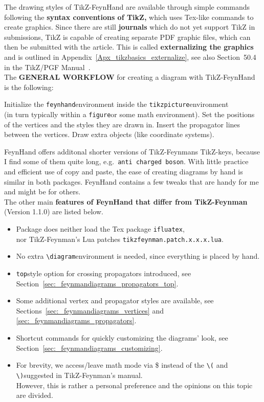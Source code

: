 \documentclass[10pt,letterpaper,twoside,notitlepage]{article}
\numberwithin{figure}{section}
\begin{document}
The drawing styles of TikZ-FeynHand are available through simple commands 
following the \textbf{syntax conventions of TikZ,} 
which uses Tex-like commands to create graphics.
Since there are still \textbf{journals} which do not yet support TikZ in submissions,
TikZ is capable of creating separate PDF graphic files,
which can then be submitted with the article.
This is called \textbf{externalizing the graphics} and is outlined in
Appendix~\ref{Apx_tikzbasics_externalize},
see also Section~50.4 in the TikZ/PGF Manual~\cite{tikz}.
\\[1.5mm]
%
\noindent
The \textbf{GENERAL WORKFLOW} for creating a diagram with TikZ-FeynHand is the following: 
\begin{itemize}
\itembf[0.]
	Initialize the \vercol\verb$feynhand$\txcol environment 
	inside the \vercol\verb$tikzpicture$\txcol environment\\
	(in turn typically within a \vercol\verb$figure$\txcol or some math environment).
	\itembf[1.]
	Set the positions of the vertices and the styles they are drawn in.
	\itembf[2.]
	Insert the propagator lines between the vertices.
	\itembf[x.]
	Draw extra objects (like coordinate systems).
\end{itemize}
%
FeynHand offers additonal shorter versions of TikZ-Feynmans TikZ-keys,
because I find some of them quite long, e.g.~\vercol\verb$anti charged boson$\txcol.
With little practice and efficient use of copy and paste, 
the ease of creating diagrams by hand is similar in both packages.
FeynHand contains a few tweaks that are handy for me and might be for others. 
\\[1mm]
The other main \textbf{features of FeynHand that differ from TikZ-Feynman} 
(Version 1.1.0) are listed below.
%
\begin{itemize}
	\item
	Package does neither load the Tex package \vercol\verb$ifluatex$\txcol,\\
	nor TikZ-Feynman's Lua patches \vercol\verb$tikzfeynman.patch.x.x.x.lua$\txcol.
	\item
	No extra \vercol\verb$\diagram$\txcol environment is needed, 
	since everything is placed by hand.
	\item
	\vercol\verb$top$\txcol style option for crossing propagators introduced, 
	see Section~\ref{sec:_feynmandiagrams_propagators_top}.
	\item
	Some additional vertex and propagator styles are available,
	see Sections~\ref{sec:_feynmandiagrams_vertices} 
	and \ref{sec:_feynmandiagrams_propagators}. 
	\item
	Shortcut commands for quickly customizing the diagrams' look,
	see Section~\ref{sec:_feynmandiagrams_customizing}.
	\item
	For brevity, we access/leave math mode via \$ instead of the \vercol\verb$\($\txcol 
	and \vercol\verb$\)$\txcol suggested in TikZ-Feynman's manual.\\
	However, this is rather a personal preference and the opinions on this topic are divided.
\end{itemize}
\end{document}
